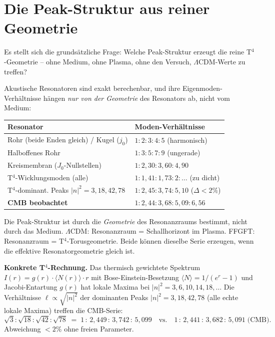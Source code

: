 \section{Die Peak-Struktur aus reiner Geometrie}

Es stellt sich die grundsätzliche Frage: Welche Peak-Struktur erzeugt die
reine T$^4$-Geometrie -- ohne Medium, ohne Plasma, ohne den Versuch,
$\Lambda$CDM-Werte zu treffen?

Akustische Resonatoren sind exakt berechenbar, und ihre Eigenmoden-Verhältnisse
hängen \emph{nur von der Geometrie} des Resonators ab, nicht vom Medium:
\begin{center}
\begin{tabular}{p{5.5cm}p{6cm}}
\toprule
\textbf{Resonator} & \textbf{Moden-Verhältnisse} \\
\midrule
Rohr (beide Enden gleich) / Kugel ($j_0$) & $1:2:3:4:5$ (harmonisch) \\
Halboffenes Rohr & $1:3:5:7:9$ (ungerade) \\
Kreismembran ($J_0$-Nullstellen) & $1:2{,}30:3{,}60:4{,}90$ \\
T$^4$-Wicklungsmoden (alle) & $1:1{,}41:1{,}73:2:\ldots$ (zu dicht) \\
T$^4$-dominant. Peaks $|n|^2=3,18,42,78$ & $1:2{,}45:3{,}74:5{,}10$ ($\Delta < 2\%$) \\
\midrule
\textbf{CMB beobachtet} & $1:2{,}44:3{,}68:5{,}09:6{,}56$ \\
\bottomrule
\end{tabular}
\end{center}

Die Peak-Struktur ist durch die \emph{Geometrie} des Resonanzraums bestimmt,
nicht durch das Medium. $\Lambda$CDM: Resonanzraum = Schallhorizont im Plasma.
FFGFT: Resonanzraum = T$^4$-Torusgeometrie. Beide können dieselbe Serie
erzeugen, wenn die effektive Resonatorgeometrie gleich ist.

\textbf{Konkrete T$^4$-Rechnung.}
Das thermisch gewichtete Spektrum $I(r) = g(r)\cdot\langle N(r)\rangle\cdot r$
mit Bose-Einstein-Besetzung $\langle N\rangle = 1/(e^r-1)$ und Jacobi-Entartung
$g(r)$ hat lokale Maxima bei $|n|^2 = 3, 6, 10, 14, 18, \ldots$ Die
Verhältnisse $\ell \propto \sqrt{|n|^2}$ der dominanten Peaks
$|n|^2 = 3, 18, 42, 78$ (alle echte lokale Maxima) treffen die CMB-Serie:
\[
  \sqrt{3}:\sqrt{18}:\sqrt{42}:\sqrt{78}
  \;=\; 1\,:\,2{,}449\,:\,3{,}742\,:\,5{,}099
  \quad\text{vs.}\quad
  1\,:\,2{,}441\,:\,3{,}682\,:\,5{,}091\;\text{(CMB)}.
\]
Abweichung $< 2\%$ ohne freien Parameter.

